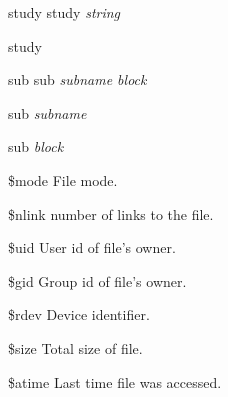 \documentclass[a4paper,11pt]{book}
\begin{document}
\noindent 

\noindent 

\noindent 

\noindent 

\noindent 

\noindent 

\noindent 

\noindent 

\noindent 

\noindent 

\noindent study study \textit{string}

\noindent 

\noindent study

\noindent 

\noindent sub sub \textit{subname block}

\noindent 

\noindent sub \textit{subname}

\noindent 

\noindent sub \textit{block}

\noindent 

 \$mode File mode.

\noindent 

\noindent 

\noindent 

 \$nlink number of links to the file.

\noindent 

\noindent 

\noindent 

 \$uid User id of file's owner.

\noindent 

\noindent 

\noindent 

 \$gid Group id of file's owner.

\noindent 

\noindent 

\noindent 

 \$rdev Device identifier.

\noindent 

\noindent 

\noindent 

 \$size Total size of file.

\noindent 

\noindent 

\noindent 

 \$atime Last time file was accessed.
\end{document}
